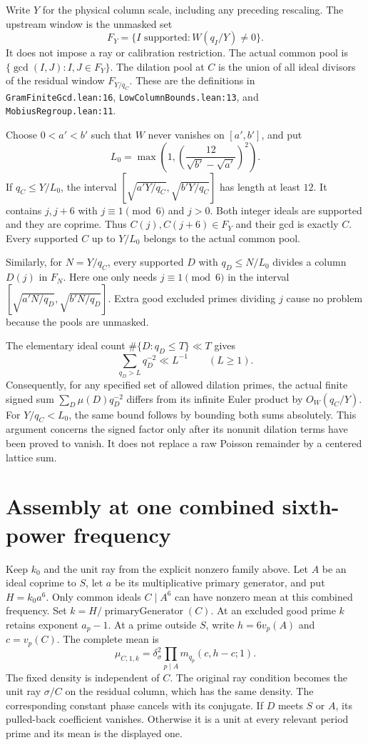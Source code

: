 \documentclass{article}
\begin{document}
Write $Y$ for the physical column scale, including any preceding rescaling.
The upstream window is the unmasked set
\[
 F_Y=\{I\text{ supported}:W(q_I/Y)\ne0\}.
\]
It does not impose a ray or calibration restriction.
The actual common pool is $\{\gcd(I,J):I,J\in F_Y\}$.
The dilation pool at $C$ is the union of all ideal divisors of the residual
window $F_{Y/q_C}$.
These are the definitions in \texttt{GramFiniteGcd.lean:16},
\texttt{LowColumnBounds.lean:13}, and \texttt{MobiusRegroup.lean:11}.

Choose $0<a'<b'$ such that $W$ never vanishes on $[a',b']$, and put
\[
 L_0=\max\left(1,\left(\frac{12}{\sqrt{b'}-\sqrt{a'}}\right)^2\right).
\]
If $q_C\le Y/L_0$, the interval
$[\sqrt{a'Y/q_C},\sqrt{b'Y/q_C}]$ has length at least $12$.
It contains $j,j+6$ with $j\equiv1\pmod6$ and $j>0$.
Both integer ideals are supported and they are coprime.
Thus $C(j),C(j+6)\in F_Y$ and their gcd is exactly $C$.
Every supported $C$ up to $Y/L_0$ belongs to the actual common pool.

Similarly, for $N=Y/q_C$, every supported $D$ with $q_D\le N/L_0$
divides a column $D(j)$ in $F_N$.
Here one only needs $j\equiv1\pmod6$ in the interval
$[\sqrt{a'N/q_D},\sqrt{b'N/q_D}]$.
Extra good excluded primes dividing $j$ cause no problem because the pools
are unmasked.

The elementary ideal count $\#\{D:q_D\le T\}\ll T$ gives
\[
 \sum_{q_D>L}q_D^{-2}\ll L^{-1}\qquad(L\ge1).
\]
Consequently, for any specified set of allowed dilation primes, the actual
finite signed sum $\sum_D\mu(D)q_D^{-2}$ differs from its infinite Euler
product by $O_W(q_C/Y)$.
For $Y/q_C<L_0$, the same bound follows by bounding both sums absolutely.
This argument concerns the signed factor only after its nonunit dilation
terms have been proved to vanish.
It does not replace a raw Poisson remainder by a centered lattice sum.

\section*{Assembly at one combined sixth-power frequency}

Keep $k_0$ and the unit ray from the explicit nonzero family above.
Let $A$ be an ideal coprime to $S$, let $a$ be its multiplicative primary
generator, and put $H=k_0a^6$.
Only common ideals $C\mid A^6$ can have nonzero mean at this combined
frequency.
Set $k=H/\operatorname{primaryGenerator}(C)$.
At an excluded good prime $k$ retains exponent $a_p-1$.
At a prime outside $S$, write $h=6v_p(A)$ and $c=v_p(C)$.
The complete mean is
\[
 \mu_{C,1,k}=\delta_\sigma^2
   \prod_{p\mid A}m_{q_p}(c,h-c;1).
\]
The fixed density is independent of $C$.
The original ray condition becomes the unit ray $\sigma/C$ on the residual
column, which has the same density.
The corresponding constant phase cancels with its conjugate.
If $D$ meets $S$ or $A$, its pulled-back coefficient vanishes.
Otherwise it is a unit at every relevant period prime and its mean is the
displayed one.
\end{document}
